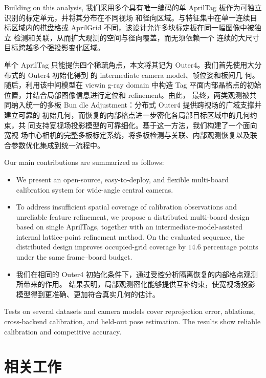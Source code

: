 \documentclass[letterpaper, 10 pt, conference]{ieeeconf}  %
\begin{document}
Building on this analysis, 我们采用多个具有唯一编码的单
AprilTag 板作为可独立识别的标定单元，并将其分布在不同视场
和径向区域。与特征集中在单一连续目标区域内的棋盘格或
AprilGrid 不同，该设计允许多块标定板在同一幅图像中被独立
检测和关联，从而扩大观测的空间与径向覆盖，而无须依赖一个
连续的大尺寸目标跨越多个强投影变化区域。


单个 AprilTag 只能提供四个稀疏角点，本文将其记为
Outer4。我们首先使用大分布式的 Outer4 初始化得到
的 intermediate camera model、帧位姿和板间几
何。随后，利用该中间模型在 viewin
g-ray domain 中构造 Tag 平面内部晶格点的初始位置，并结合局部图像信息进行定位和 refinement。由此，
最终，两类观测被共同纳入统一的多板 Bun
dle Adjustment：分布式 Outer4 提供跨视场的广域支撑并建立可靠的
初始几何，而恢复的内部格点进一步密化各局部目标区域中的几何约束，共
同支持宽视场投影模型的可靠细化。基于这一方法，我们构建了一个面向宽视
场中心相机的完整多板标定系统，将多板检测与关联、内部观测恢复以及联合参数优化集成到统一流程中。

Our main contributions are summarized as follows:

\begin{itemize}
\setlength{\itemsep}{1pt}
\setlength{\parskip}{0pt}
\setlength{\parsep}{0pt}
\item We present an open-source, easy-to-deploy, and flexible multi-board
calibration system for wide-angle central cameras.
\item To address insufficient spatial coverage of calibration observations and unreliable feature refinement, we propose a distributed multi-board design based on single AprilTags, together with an intermediate-model-assisted internal lattice-point refinement method. On the evaluated sequence, the distributed design improves occupied-grid coverage by $14.6$ percentage points under the same frame--board budget.
\item 我们在相同的 Outer4 初始化条件下，通过受控分析隔离恢复的内部格点观测所带来的作用。
结果表明，局部观测密化能够提供互补约束，使宽视场投影模型得到更准确、更加符合真实几何的估计。
\end{itemize}

Tests on several datasets and camera models cover reprojection error, ablations,
cross-backend calibration, and held-out pose estimation. The results show
reliable calibration and competitive accuracy.

\section{相关工作}
\end{document}
